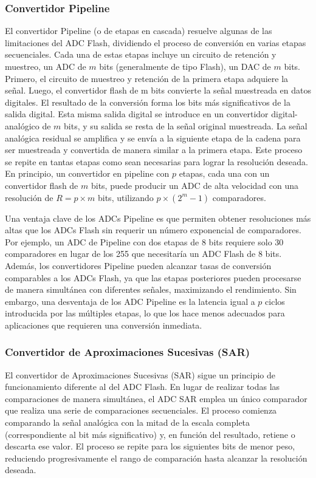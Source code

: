 \subsubsection{Convertidor Pipeline}

El convertidor Pipeline (o de etapas en cascada) resuelve algunas de las limitaciones del ADC Flash, dividiendo el proceso de conversión en varias etapas secuenciales. Cada una de estas etapas incluye un circuito de retención y muestreo, un ADC de $m$ bits (generalmente de tipo Flash), un DAC de $m$ bits. Primero, el circuito de muestreo y retención de la primera etapa adquiere la señal. Luego, el convertidor flash de m bits convierte la señal muestreada en datos digitales. El resultado de la conversión forma los bits más significativos de la salida digital. Esta misma salida digital se introduce en un convertidor digital-analógico de $m$ bits, y su salida se resta de la señal original muestreada. La señal analógica residual se amplifica y se envía a la siguiente etapa de la cadena para ser muestreada y convertida de manera similar a la primera etapa. Este proceso se repite en tantas etapas como sean necesarias para lograr la resolución deseada. En principio, un convertidor en pipeline con $p$ etapas, cada una con un convertidor flash de $m$ bits, puede producir un ADC de alta velocidad con una resolución de $R = p \times m $ bits, utilizando $p \times (2^m - 1)$ comparadores.

Una ventaja clave de los ADCs Pipeline es que permiten obtener resoluciones más altas que los ADCs Flash sin requerir un número exponencial de comparadores. Por ejemplo, un ADC de Pipeline con dos etapas de 8 bits requiere solo 30 comparadores en lugar de los 255 que necesitaría un ADC Flash de 8 bits. Además, los convertidores Pipeline pueden alcanzar tasas de conversión comparables a los ADCs Flash, ya que las etapas posteriores pueden procesarse de manera simultánea con diferentes señales, maximizando el rendimiento. Sin embargo, una desventaja de los ADC Pipeline es la latencia igual a $p$ ciclos introducida por las múltiples etapas, lo que los hace menos adecuados para aplicaciones que requieren una conversión inmediata.


\subsubsection{Convertidor de Aproximaciones Sucesivas (SAR)}

El convertidor de Aproximaciones Sucesivas (SAR) sigue un principio de funcionamiento diferente al del ADC Flash. En lugar de realizar todas las comparaciones de manera simultánea, el ADC SAR emplea un único comparador que realiza una serie de comparaciones secuenciales. El proceso comienza comparando la señal analógica con la mitad de la escala completa (correspondiente al bit más significativo) y, en función del resultado, retiene o descarta ese valor. El proceso se repite para los siguientes bits de menor peso, reduciendo progresivamente el rango de comparación hasta alcanzar la resolución deseada.

